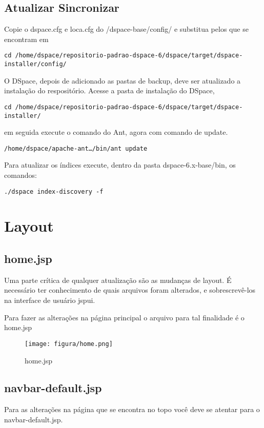 \documentclass[12pt,hidelinks]{article}
\begin{document}
\subsection{Atualizar Sincronizar}

Copie o dspace.cfg e loca.cfg do /dspace-base/config/ e substitua pelos que se encontram em
\begin{verbatim}
cd /home/dspace/repositorio-padrao-dspace-6/dspace/target/dspace-installer/config/
\end{verbatim}
O DSpace, depois de adicionado as pastas de backup, deve ser atualizado a instalação do respositório. Acesse a pasta de instalação do DSpace,
\begin{verbatim}
cd /home/dspace/repositorio-padrao-dspace-6/dspace/target/dspace-installer/
\end{verbatim}
em seguida execute o comando do Ant, agora com comando de update.
\begin{verbatim}
/home/dspace/apache-ant…/bin/ant update
\end{verbatim}

Para atualizar os índices execute, dentro da pasta dspace-6.x-base/bin, os comandos:
\begin{verbatim}
./dspace index-discovery -f
\end{verbatim}

\newpage
\section{Layout}
\newpage

\subsection{home.jsp}

Uma parte crítica de qualquer atualização são as mudanças de layout. É necessário ter conhecimento de quais arquivos foram alterados, e sobrescrevê-los na interface de usuário jspui. 

Para fazer as alterações na página principal o arquivo para tal finalidade é o home.jsp

        \begin{figure}[!htp]
                \centering
                \texttt{[image: figura/home.png]}
                \caption{home.jsp}
            \label{Rotulo}
        \end{figure}

\subsection{navbar-default.jsp}
Para as alterações na página que se encontra no topo você deve se atentar para o navbar-default.jsp.
\end{document}
